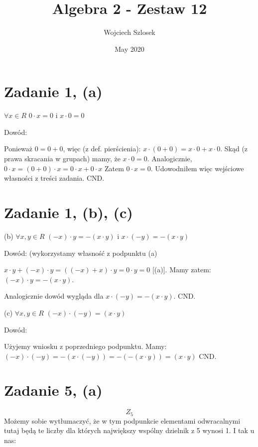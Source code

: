 \documentclass{article}
\title{Algebra 2 - Zestaw 12}
\author{Wojciech Szlosek}
\date{May 2020}
\begin{document}
\maketitle

\section{Zadanie 1, (a)}

$ \forall x \in R $  $0 \cdot x = 0$ i $x \cdot 0 = 0$ \newline

Dowód: \newline

Ponieważ $0 = 0+0$, więc (z def. pierścienia): $x \cdot (0+0) = x\cdot0 + x \cdot 0$. Skąd (z prawa skracania w grupach) mamy, że $x \cdot 0 = 0$. Analogicznie, $0 \cdot x = (0+0) \cdot x = 0\cdot x + 0\cdot x$ Zatem $0 \cdot x = 0$. Udowodniłem więc wejściowe własności z treści zadania. CND.

\section{Zadanie 1, (b), (c)}

(b) $ \forall x,y \in R$  $(-x)\cdot y = -(x \cdot y)$ i $x \cdot(-y) = -(x \cdot y)$ \newline

Dowód: (wykorzystamy własność z podpunktu (a) \newline

$x \cdot y + (-x) \cdot y = ((-x)+x)\cdot y = 0 \cdot y = 0$ [(a)]. Mamy zatem: $(-x) \cdot y = - (x \cdot y)$. \newline

Analogicznie dowód wygląda dla $x \cdot (-y) = - (x\cdot y)$. CND. \newline \newline

(c) $ \forall x,y \in R$ $(-x) \cdot (-y) = (x\cdot y)$ \newline

Dowód: \newline

Użyjemy wniosku z poprzedniego podpunktu. Mamy: $(-x) \cdot (-y) = - (x \cdot (-y)) = -(-(x\cdot y)) = (x \cdot y)$ CND. \newline \newline \newline 

\section{Zadanie 5, (a)}
$$Z_5$$
Możemy sobie wytłumaczyć, że w tym podpunkcie elementami odwracalnymi tutaj będą te liczby dla których największy wspólny dzielnik z 5 wynosi 1. I tak u nas: \newline
\end{document}

